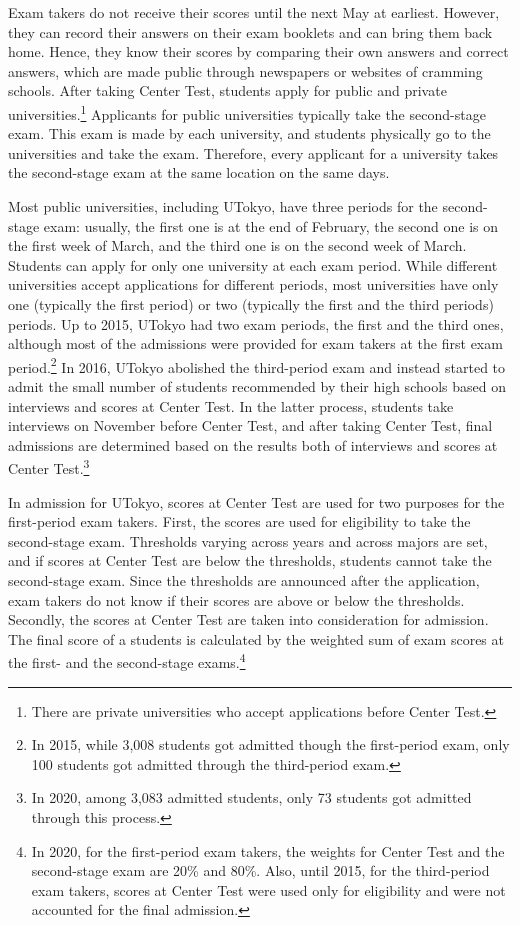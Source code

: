 \documentclass[12pt,letterpaper]{article}
\begin{document}
Exam takers do not receive their scores until the next May at earliest.
However, they can record their answers on their exam booklets and can bring them back home.
Hence, they know their scores by comparing their own answers and correct answers, which are made public through newspapers or websites of cramming schools.
After taking Center Test, students apply for public and private universities.\footnote{
  There are private universities who accept applications before Center Test.
}
Applicants for public universities typically take the second-stage exam.
This exam is made by each university, and students physically go to the universities and take the exam.
Therefore, every applicant for a university takes the second-stage exam at the same location on the same days.

Most public universities, including UTokyo, have three periods for the second-stage exam:
usually, the first one is at the end of February, the second one is on the first week of March, and the third one is on the second week of March.
Students can apply for only one university at each exam period.
While different universities accept applications for different periods, most universities have only one (typically the first period) or two (typically the first and the third periods) periods.
Up to 2015, UTokyo had two exam periods, the first and the third ones, although most of the admissions were provided for exam takers at the first exam period.\footnote{
  In 2015, while 3,008 students got admitted though the first-period exam, only 100 students got admitted through the third-period exam.
}
In 2016, UTokyo abolished the third-period exam and instead started to admit the small number of students recommended by their high schools based on interviews and scores at Center Test.
In the latter process, students take interviews on November before Center Test, and after taking Center Test, final admissions are determined based on the results both of interviews and scores at Center Test.\footnote{
  In 2020, among 3,083 admitted students, only 73 students got admitted through this process.
}

In admission for UTokyo, scores at Center Test are used for two purposes for the first-period exam takers.
First, the scores are used for eligibility to take the second-stage exam.
Thresholds varying across years and across majors are set, and if scores at Center Test are below the thresholds, students cannot take the second-stage exam.
Since the thresholds are announced after the application, exam takers do not know if their scores are above or below the thresholds.
Secondly, the scores at Center Test are taken into consideration for admission.
The final score of a students is calculated by the weighted sum of exam scores at the first- and the second-stage exams.\footnote{
  In 2020, for the first-period exam takers, the weights for Center Test and the second-stage exam are 20\% and 80\%.
  Also, until 2015, for the third-period exam takers, scores at Center Test were used only for eligibility and were not accounted for the final admission.
}
\end{document}
